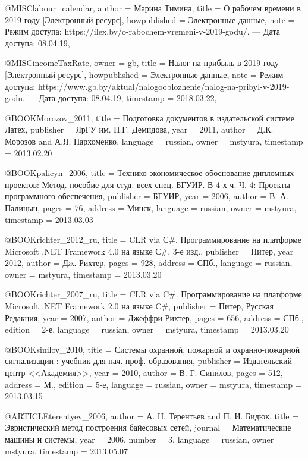 @MISC{labour_calendar,
  author       = {Марина Тимина},
  title        = {О рабочем времени в 2019 году [Электронный ресурс]},
  howpublished = {Электронные данные},
  note         = {Режим доступа: https://ilex.by/o-rabochem-vremeni-v-2019-godu/. --- Дата доступа: 08.04.19},
}

@MISC{incomeTaxRate,
  owner = {gb},
  title = {Налог на прибыль в 2019 году [Электронный ресурс]},
  howpublished = {Электронные данные},
  note = {Режим доступа: https://www.gb.by/aktual/nalogooblozhenie/nalog-na-pribyl-v-2019-godu. --- Дата доступа: 08.04.19},
  timestamp = {2018.03.22},
}

@BOOK{Morozov_2011,
  title = {Подготовка документов в издательской системе Латех},
  publisher = {ЯрГУ им. П.Г. Демидова},
  year = {2011},
  author = {Д.К. Морозов and А.Я. Пархоменко},
  language = {russian},
  owner = {mstyura},
  timestamp = {2013.02.20}
}

@BOOK{palicyn_2006,
  title = {Технико-экономическое обоснование дипломных проектов: Метод. пособие
	для студ. всех спец. БГУИР. В 4-х ч. Ч. 4: Проекты программного обеспечения},
  publisher = {БГУИР},
  year = {2006},
  author = {В. А. Палицын},
  pages = {76},
  address = {Минск},
  language = {russian},
  owner = {mstyura},
  timestamp = {2013.03.03}
}

@BOOK{richter_2012_ru,
  title = {CLR via С\#. Программирование на платформе Microsoft .NET Framework
	4.0 на языке С\#. 3-е изд.},
  publisher = {Питер},
  year = {2012},
  author = {Дж. Рихтер},
  pages = {928},
  address = {СПб.},
  language = {russian},
  owner = {mstyura},
  timestamp = {2013.03.20}
}

@BOOK{richter_2007_ru,
  title = {CLR via C\#. Программирование на платформе Microsoft .NET Framework
	2.0 на языке C\#},
  publisher = {Питер, Русская Редакция},
  year = {2007},
  author = {Джеффри Рихтер},
  pages = {656},
  address = {СПб.},
  edition = {2-е},
  language = {russian},
  owner = {mstyura},
  timestamp = {2013.03.20}
}

@BOOK{sinilov_2010,
  title = {Системы охранной, пожарной и охранно-пожарной сигнализации : учебник
	для нач. проф. образования},
  publisher = {Издательский центр <<Академия>>},
  year = {2010},
  author = {В. Г. Синилов},
  pages = {512},
  address = {М.},
  edition = {5-е},
  language = {russian},
  owner = {mstyura},
  timestamp = {2013.03.15}
}

@ARTICLE{terentyev_2006,
  author = {А. Н. Терентьев and П. И. Бидюк},
  title = {Эвристический метод построения байесовых сетей},
  journal = {Математические машины и системы},
  year = {2006},
  number = {3},
  language = {russian},
  owner = {mstyura},
  timestamp = {2013.05.07}
}

